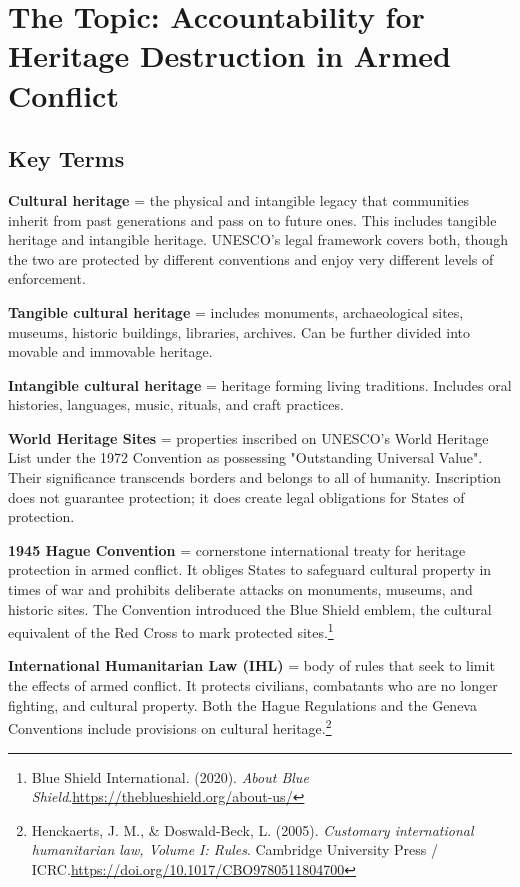 \section{The Topic: Accountability for Heritage Destruction in Armed Conflict}

\subsection{Key Terms}

\textbf{Cultural heritage} = the physical and intangible legacy that communities inherit from past generations and pass on to future ones. This includes tangible heritage and intangible heritage. UNESCO's legal framework covers both, though the two are protected by different conventions and enjoy very different levels of enforcement.

\textbf{Tangible cultural heritage} = includes monuments, archaeological sites, museums, historic buildings, libraries, archives. Can be further divided into movable and immovable heritage.

\textbf{Intangible cultural heritage} = heritage forming living traditions. Includes oral histories, languages, music, rituals, and craft practices.

\textbf{World Heritage Sites} = properties inscribed on UNESCO's World Heritage List under the 1972 Convention as possessing "Outstanding Universal Value". Their significance transcends borders and belongs to all of humanity. Inscription does not guarantee protection; it does create legal obligations for States of protection.

\textbf{1945 Hague Convention} = cornerstone international treaty for heritage protection in armed conflict. It obliges States to safeguard cultural property in times of war and prohibits deliberate attacks on monuments, museums, and historic sites. The Convention introduced the Blue Shield emblem, the cultural equivalent of the Red Cross  to mark protected sites.\footnote{Blue Shield International. (2020). \emph{About Blue Shield}.\url{https://theblueshield.org/about-us/}}

\textbf{International Humanitarian Law (IHL)} = body of rules that seek to limit the effects of armed conflict. It protects civilians, combatants who are no longer fighting, and cultural property. Both the Hague Regulations and the Geneva Conventions include provisions on cultural heritage.\footnote{Henckaerts, J. M., \& Doswald-Beck, L. (2005). \emph{Customary international humanitarian law, Volume I: Rules}. Cambridge University Press / ICRC.\url{https://doi.org/10.1017/CBO9780511804700}}

